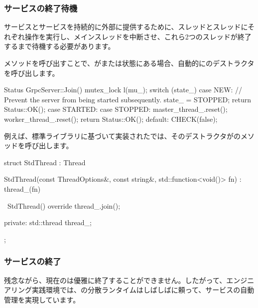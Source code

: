\begin{content}
\subsubsection{サービスの終了待機}

サービスとサービスを持続的に外部に提供するために、スレッドとスレッドにそれぞれ操作を実行し、メインスレッドを中断させ、これら2つのスレッドが終了するまで待機する必要があります。

メソッドを呼び出すことで、がまたは状態にある場合、自動的にのデストラクタを呼び出します。

\begin{leftbar}
\begin{c++}
Status GrpcServer::Join() {
  mutex_lock l(mu_);
  switch (state_) {
    case NEW:
      // Prevent the server from being started subsequently.
      state_ = STOPPED;
      return Status::OK();
    case STARTED:
    case STOPPED:
      master_thread_.reset();
      worker_thread_.reset();
      return Status::OK();
    default:
      CHECK(false);
  }
}
\end{c++}
\end{leftbar}

例えば、標準ライブラリに基づいて実装されたでは、そのデストラクタがのメソッドを呼び出します。


\begin{leftbar}
\begin{c++}
struct StdThread : Thread {
  StdThread(const ThreadOptions&, const string&, 
      std::function<void()> fn)
    : thread_(fn) {
  }

  ~StdThread() override { 
    thread_.join(); 
  }

 private:
  std::thread thread_;
};
\end{c++}
\end{leftbar}

\subsubsection{サービスの終了}

残念ながら、現在のは優雅に終了することができません。したがって、エンジニアリング実践環境では、\tf{}の分散ランタイムはしばしばに頼って、サービスの自動管理を実現しています。


\end{content}

